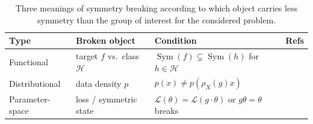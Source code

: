 \documentclass[mathematics,review,submit,moreauthors]{Definitions/mdpi}
\begin{document}
\begin{table}[ht]
    \centering
    \begin{tabularx}{\textwidth}{|l|l|>{\raggedright\arraybackslash}X|>{\raggedright\arraybackslash}X|}
        \hline
        \textbf{Type} & \textbf{Broken object} & \textbf{Condition} & \textbf{Refs} \\
        \hline
        Functional & target $f$ vs.\ class $\mathcal{H}$ & $\operatorname{Sym}(f)\subsetneq\operatorname{Sym}(h)$ for $h\in \mathcal{H}$ & \citep{wang2023a,zhang2019p3icml,smidt2021prr,lawrence2024,goel2025} \\
        \hline
        Distributional & data density $p$ & $p(x)\neq p(\rho_X(g)x)$ & \citep{lawrence2026,rygiel2026,chen2020,urbano2026} \\
        \hline
        Parameter-space & loss / symmetric state & $\mathcal{L}(\theta)=\mathcal{L}(g\cdot\theta)$ or $g\theta=\theta$ breaks & \citep{kunin2020,tanaka2021,ziyin2025,arjevani2023} \\
        \hline
    \end{tabularx}
    \caption{Three meanings of symmetry breaking according to which object carries less symmetry than the group of interest for the considered problem.}
    \label{table:symmetry-breaking}
\end{table}
\end{document}
